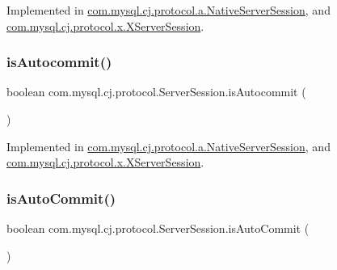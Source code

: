 Implemented in \mbox{\hyperlink{classcom_1_1mysql_1_1cj_1_1protocol_1_1a_1_1_native_server_session_a8d5589f1a033854b5fb7bf4bd687af3f}{com.\+mysql.\+cj.\+protocol.\+a.\+Native\+Server\+Session}}, and \mbox{\hyperlink{classcom_1_1mysql_1_1cj_1_1protocol_1_1x_1_1_x_server_session_a1f0cc28ad6438f7e898fdcbd1da430de}{com.\+mysql.\+cj.\+protocol.\+x.\+X\+Server\+Session}}.

\mbox{\label{interfacecom_1_1mysql_1_1cj_1_1protocol_1_1_server_session_ab6c5390dc2b89ba2e41c6688523aef87}} 
\subsubsection{\texorpdfstring{is\+Autocommit()}{isAutocommit()}}
{\footnotesize\ttfamily boolean com.\+mysql.\+cj.\+protocol.\+Server\+Session.\+is\+Autocommit (\begin{DoxyParamCaption}{ }\end{DoxyParamCaption})}



Implemented in \mbox{\hyperlink{classcom_1_1mysql_1_1cj_1_1protocol_1_1a_1_1_native_server_session_a443cf8223386212f9812b802f1821d00}{com.\+mysql.\+cj.\+protocol.\+a.\+Native\+Server\+Session}}, and \mbox{\hyperlink{classcom_1_1mysql_1_1cj_1_1protocol_1_1x_1_1_x_server_session_ad7dc3220f3f894bcee15137e423a2d99}{com.\+mysql.\+cj.\+protocol.\+x.\+X\+Server\+Session}}.

\mbox{\label{interfacecom_1_1mysql_1_1cj_1_1protocol_1_1_server_session_a9c74fcf2711698d212e1f30a104a0425}} 
\subsubsection{\texorpdfstring{is\+Auto\+Commit()}{isAutoCommit()}}
{\footnotesize\ttfamily boolean com.\+mysql.\+cj.\+protocol.\+Server\+Session.\+is\+Auto\+Commit (\begin{DoxyParamCaption}{ }\end{DoxyParamCaption})}



